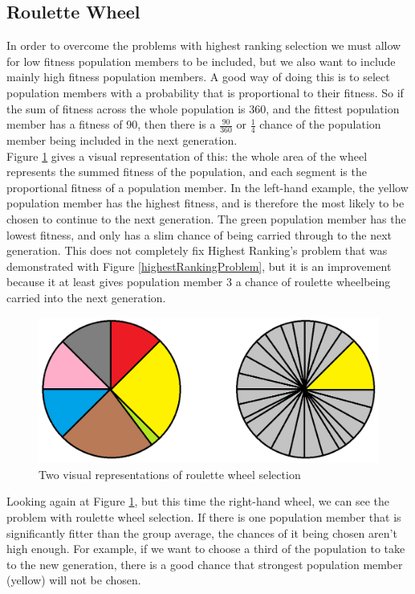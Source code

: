 \documentclass[]{report}
\begin{document}
\subsection{Roulette Wheel}

In order to overcome the problems with highest ranking selection we must allow for low fitness population members to be included, but we also want to include mainly high fitness population members. A good way of doing this is to select population members with a probability that is proportional to their fitness. So if the sum of fitness across the whole population is 360, and the fittest population member has a fitness of 90, then there is a $\frac{90}{360}$ or $\frac{1}{4}$ chance of the population member being included in the next generation.\\

Figure \ref{rouletteWheel} gives a visual representation of this: the whole area of the wheel represents the summed fitness of the population, and each segment is the proportional fitness of a population member. In the left-hand example, the yellow population member has the highest fitness, and is therefore the most likely to be chosen to continue to the next generation. The green population member has the lowest fitness, and only has a slim chance of being carried through to the next generation. This does not completely fix Highest Ranking's problem that was demonstrated with Figure \ref{highestRankingProblem}, but it is an improvement because it at least gives population member 3 a chance of roulette wheelbeing carried into the next generation.\\

\begin{figure}
	\centering
	\includegraphics[scale=0.4]{figures/rouletteWheel.png}
	\caption{Two visual representations of roulette wheel selection}
	\label{rouletteWheel}
\end{figure}

Looking again at Figure \ref{rouletteWheel}, but this time the right-hand wheel, we can see the problem with roulette wheel selection. If there is one population member that is significantly fitter than the group average, the chances of it being chosen aren't high enough. For example, if we want to choose a third of the population to take to the new generation, there is a good chance that strongest population member (yellow) will not be chosen.
\end{document}
